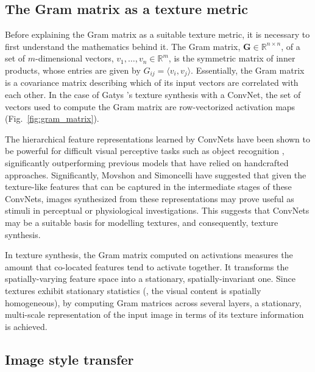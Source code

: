 \subsection{The Gram matrix as a texture metric}

Before explaining the Gram matrix as a suitable texture metric, it is necessary to first understand the mathematics behind it. The Gram matrix, $\mathbf{G} \in \mathbb{R}^{n \times n}$, of a set of $m$-dimensional vectors, $v_1, \dots , v_n \in \mathbb{R}^m$, is the symmetric matrix of inner products, whose entries are given by $G_{ij} = \langle v_i, v_j \rangle$. Essentially, the Gram matrix is a covariance matrix describing which of its input vectors are correlated with each other. In the case of Gatys \etal's \cite{gatys2015} texture synthesis with a ConvNet, the set of vectors used to compute the Gram matrix are row-vectorized activation maps (Fig.\ \ref{fig:gram_matrix}).


The hierarchical feature representations learned by ConvNets have been shown to be powerful for difficult visual perceptive tasks such as object recognition \cite{krizhevsky2012,simonyan2014very}, significantly outperforming previous models that have relied on handcrafted approaches. Significantly, Movshon and Simoncelli \cite{movshon2014} have suggested that given the texture-like features that can be captured in the intermediate stages of these ConvNets, images synthesized from these representations may prove useful as stimuli in perceptual or physiological investigations. This suggests that ConvNets may be a suitable basis for modelling textures, and consequently, texture synthesis.

In texture synthesis, the Gram matrix computed on activations measures the amount that co-located features tend to activate together. It transforms the spatially-varying feature space into a stationary, spatially-invariant one. Since textures exhibit stationary statistics (\ie, the visual content is spatially homogeneous), by computing Gram matrices across several layers, a stationary, multi-scale representation of the input image in terms of its texture information is achieved.

\subsection{Image style transfer}

